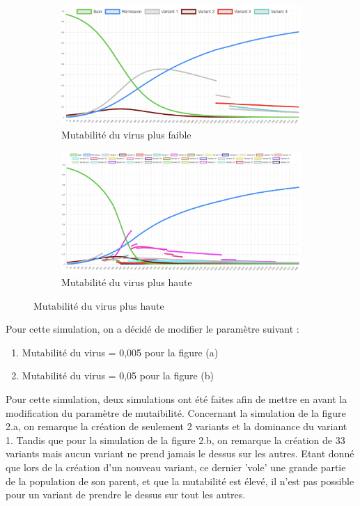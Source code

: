 \documentclass{article}
\begin{document}
\begin{figure}[h]
  \begin{subfigure}{.5\textwidth}
  \centering
  \includegraphics[width=1\linewidth]{images/Simulation2_1.png}
  \caption{Mutabilité du virus plus faible}
  \label{fig:sub1}
\end{subfigure}%
\begin{subfigure}{.5\textwidth}
  \centering
  \includegraphics[width=1\linewidth]{images/Simulation2_2.png}
  \caption{Mutabilité du virus plus haute}
  \label{fig:sub2}
\end{subfigure}
\end{figure}

Pour cette simulation, on a décidé de modifier le paramètre suivant :
\begin{enumerate}
    \item Mutabilité du virus = 0,005 pour la figure (a)
    \item Mutabilité du virus = 0,05 pour la figure (b) \\
\end{enumerate}
\noindent

Pour cette simulation, deux simulations ont été faites afin de mettre en avant la modification du paramètre de mutaibilité. Concernant la simulation de la figure 2.a, on remarque la création de seulement 2 variants et la dominance du variant 1. Tandis que pour la simulation de la figure 2.b, on remarque la création de 33 variants mais aucun variant ne prend jamais le dessus sur les autres. Etant donné que lors de la création d'un nouveau variant, ce dernier 'vole' une grande partie de la population de son parent, et que la mutabilité est élevé, il n'est pas possible pour un variant de prendre le dessus sur tout les autres.
\end{document}

